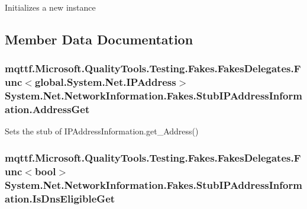 Initializes a new instance



\subsection{Member Data Documentation}
\hypertarget{class_system_1_1_net_1_1_network_information_1_1_fakes_1_1_stub_i_p_address_information_a0b0ac3cec5a182719ee35a68e1174ec3}{
\subsubsection[{Address\-Get}]{\setlength{\rightskip}{0pt plus 5cm}mqttf.\-Microsoft.\-Quality\-Tools.\-Testing.\-Fakes.\-Fakes\-Delegates.\-Func$<$global.\-System.\-Net.\-I\-P\-Address$>$ System.\-Net.\-Network\-Information.\-Fakes.\-Stub\-I\-P\-Address\-Information.\-Address\-Get}}\label{class_system_1_1_net_1_1_network_information_1_1_fakes_1_1_stub_i_p_address_information_a0b0ac3cec5a182719ee35a68e1174ec3}


Sets the stub of I\-P\-Address\-Information.\-get\-\_\-\-Address()

\hypertarget{class_system_1_1_net_1_1_network_information_1_1_fakes_1_1_stub_i_p_address_information_a0461922c5832174b1265ab462cb5c621}{
\subsubsection[{Is\-Dns\-Eligible\-Get}]{\setlength{\rightskip}{0pt plus 5cm}mqttf.\-Microsoft.\-Quality\-Tools.\-Testing.\-Fakes.\-Fakes\-Delegates.\-Func$<$bool$>$ System.\-Net.\-Network\-Information.\-Fakes.\-Stub\-I\-P\-Address\-Information.\-Is\-Dns\-Eligible\-Get}}\label{class_system_1_1_net_1_1_network_information_1_1_fakes_1_1_stub_i_p_address_information_a0461922c5832174b1265ab462cb5c621}


